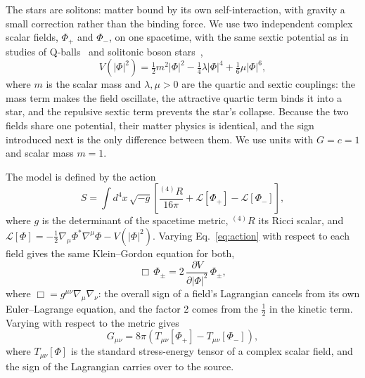 \documentclass[twocolumn,floatfix,aps,prd,superscriptaddress,nofootinbib]{revtex4-2}
\begin{document}
The stars are solitons: matter bound by its own self-interaction, with gravity a small correction rather than the binding force. We use two independent complex scalar fields, $\Phi_+$ and $\Phi_-$, on one spacetime, with the same sextic potential as in studies of Q-balls~\cite{friedberg1976,coleman1985} and solitonic boson stars~\cite{friedberg1987,evstafyeva2026},
\begin{equation}
V(|\Phi|^2)=\tfrac12 m^2|\Phi|^2-\tfrac14\lambda|\Phi|^4+\tfrac16\mu|\Phi|^6 ,
\label{eq:potential}
\end{equation}
where $m$ is the scalar mass and $\lambda,\mu>0$ are the quartic and sextic couplings: the mass term makes the field oscillate, the attractive quartic term binds it into a star, and the repulsive sextic term prevents the star's collapse. Because the two fields share one potential, their matter physics is identical, and the sign introduced next is the only difference between them. We use units with $G=c=1$ and scalar mass $m=1$.

The model is defined by the action
\begin{equation}
S=\int d^4x\,\sqrt{-g}\left[\frac{{}^{(4)}\!R}{16\pi}+\mathcal{L}[\Phi_+]-\mathcal{L}[\Phi_-]\right],
\label{eq:action}
\end{equation}
where $g$ is the determinant of the spacetime metric, ${}^{(4)}\!R$ its Ricci scalar, and $\mathcal{L}[\Phi]=-\tfrac12\nabla_\mu\Phi^*\nabla^\mu\Phi-V(|\Phi|^2)$. Varying Eq.~\eqref{eq:action} with respect to each field gives the same Klein--Gordon equation for both,
\begin{equation}
\Box\,\Phi_\pm=2\,\frac{\partial V}{\partial|\Phi|^2}\,\Phi_\pm ,
\label{eq:kg}
\end{equation}
where $\Box=g^{\mu\nu}\nabla_\mu\nabla_\nu$: the overall sign of a field's Lagrangian cancels from its own Euler--Lagrange equation, and the factor 2 comes from the $\tfrac12$ in the kinetic term. Varying with respect to the metric gives
\begin{equation}
G_{\mu\nu}=8\pi\left(T_{\mu\nu}[\Phi_+]-T_{\mu\nu}[\Phi_-]\right),
\label{eq:einstein}
\end{equation}
where $T_{\mu\nu}[\Phi]$ is the standard stress-energy tensor of a complex scalar field, and the sign of the Lagrangian carries over to the source.
\end{document}

